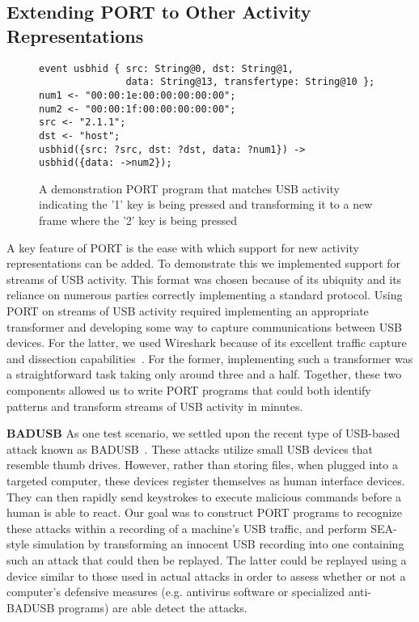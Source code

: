 \subsection{Extending PORT to Other Activity Representations}
\begin{figure}
  \begin{lstlisting}[basicstyle=\ttfamily\small,xleftmargin=.8em]
event usbhid { src: String@0, dst: String@1,
               data: String@13, transfertype: String@10 };
num1 <- "00:00:1e:00:00:00:00:00";
num2 <- "00:00:1f:00:00:00:00:00";
src <- "2.1.1";
dst <- "host";
usbhid({src: ?src, dst: ?dst, data: ?num1}) -> usbhid({data: ->num2});
  \end{lstlisting}
  \caption{A demonstration PORT program that matches USB activity indicating the '1' key is being pressed and transforming it to a new frame where the '2' key is being pressed}
  \label{fig:USB}
\end{figure}


A key feature of PORT is the ease with which support for new activity representations 
can be added. To demonstrate this
we implemented support for streams of USB activity. This format was chosen because of its ubiquity and its reliance on numerous parties correctly implementing a standard protocol.
Using PORT on streams of USB activity required implementing an appropriate transformer and developing some way to capture communications between USB devices.
For the latter, we used Wireshark because of its excellent traffic capture and dissection capabilities~\cite{wireshark}.
For the former, implementing such a transformer was a straightforward task taking only around three and a half.
Together, these two components allowed us to write PORT programs that could both identify patterns and transform streams of USB activity in minutes.

\textbf{BADUSB} As one test scenario, we settled upon the recent type of USB-based attack known as BADUSB~\cite{badusb}.
These attacks utilize small USB devices that resemble thumb drives. However, rather than storing files, when plugged into a targeted computer, these devices register themselves as human interface devices. They can then rapidly send keystrokes to execute malicious commands before a human is able to react.
Our goal was to construct PORT programs to recognize these attacks within a recording of a machine’s USB traffic, and perform SEA-style simulation by transforming an innocent USB recording into one containing such an attack
that could then be replayed.
The latter could be replayed using a device similar to those used in actual attacks in order to assess whether or not a computer’s defensive measures (e.g. antivirus software or specialized anti-BADUSB programs) are able detect the attacks. 

